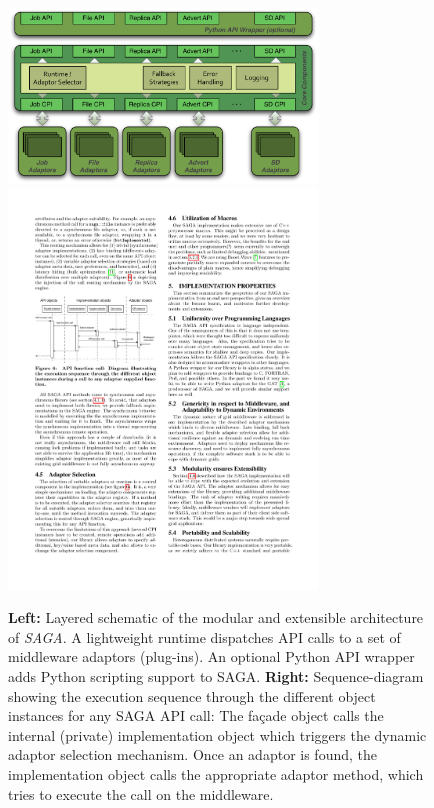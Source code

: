\documentclass[a4paper,10pt]{article}
\newcommand{\B}[1]{\textbf{#1}}
\newcommand{\sagaimpl}{\textit{SAGA}\xspace}
\newcommand{\impl}{\sagaimpl}
\begin{document}
\begin{figure}%
  \centering
  \includegraphics[width=3.23in]{./figures/saga-architecture}
  \includegraphics[width=3.23in]{./figures/saga-call-dispatch}

 \vspace{-1em}	
  \caption{\footnotesize \B{Left:} Layered schematic of the modular
  and extensible architecture of \impl. A lightweight runtime
  dispatches API calls to a set of middleware adaptors (plug-ins). An
  optional Python API wrapper adds Python scripting support to SAGA.
  \B{Right: } Sequence-diagram showing the execution sequence through
  the different object instances for any SAGA API call: The fa\c{c}ade
  object calls the internal (private) implementation object which
  triggers the dynamic adaptor selection mechanism. Once an adaptor is
  found, the implementation object calls the appropriate adaptor
  method, which tries to execute the call on the middleware. }
    
  \label{fig:saga_arch}
\end{figure}


  
 
\end{document}
